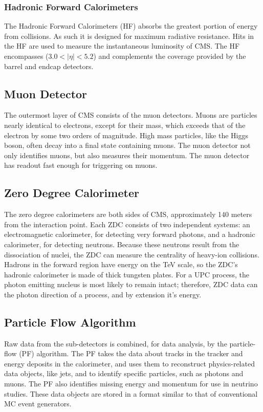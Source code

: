 \subsubsection{Hadronic Forward Calorimeters}

The Hadronic Forward Calorimeters (HF) absorbs the greatest portion of energy from collisions. As such it is designed for maximum radiative resistance. Hits in the HF are used to measure the instantaneous luminosity of CMS. The HF encompasses ($3.0<|\eta| < 5.2 $) and complements the coverage provided by the barrel and endcap detectors.

\subsection{Muon Detector}

The outermost layer of CMS consists of the muon detectors. Muons are particles nearly identical to electrons, except for their mass, which exceeds that of the electron by some two orders of magnitude. High mass particles, like the Higgs boson, often decay into a final state containing muons. The muon detector not only identifies muons, but also measures their momentum. The muon detector has readout fast enough for triggering on muons.

\subsection{Zero Degree Calorimeter}

The zero degree calorimeters are both sides of CMS, approximately 140 meters from the interaction point. Each ZDC consists of two independent systems: an electromagnetic calorimeter, for detecting very forward photons, and a hadronic calorimeter, for detecting neutrons. Because these neutrons result from the dissociation of nuclei, the ZDC can measure the centrality of heavy-ion collisions. Hadrons in the forward region have energy on the TeV scale, so the ZDC's hadronic calorimeter is made of thick tungsten plates. For a UPC process, the photon emitting nucleus is most likely to remain intact; therefore, ZDC data can the photon direction of a process, and by extension it's energy. 

\subsection{Particle Flow Algorithm}

Raw data from the sub-detectors is combined, for data analysis, by the particle-flow (PF) algorithm. The PF takes the data about tracks in the tracker and energy deposits in the calorimeter, and uses them to reconstruct physics-related data objects, like jets, and to identify specific particles, such as photons and muons. The PF also identifies missing energy and momentum for use in neutrino studies. These data objects are stored in a format similar to that of conventional MC event generators. 

